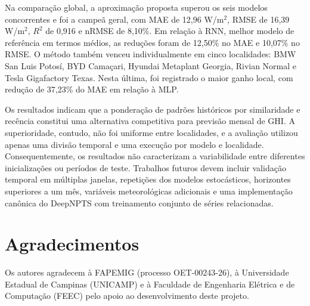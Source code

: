 \documentclass[11pt,a4paper]{article}
\begin{document}
Na comparação global, a aproximação proposta superou os seis modelos concorrentes e foi a campeã geral, com MAE de 12,96 W/m$^2$, RMSE de 16,39 W/m$^2$, $R^2$ de 0,916 e nRMSE de 8,10\%. Em relação à RNN, melhor modelo de referência em termos médios, as reduções foram de 12,50\% no MAE e 10,07\% no RMSE. O método também venceu individualmente em cinco localidades: BMW San Luis Potosí, BYD Camaçari, Hyundai Metaplant Georgia, Rivian Normal e Tesla Gigafactory Texas. Nesta última, foi registrado o maior ganho local, com redução de 37,23\% do MAE em relação à MLP.

Os resultados indicam que a ponderação de padrões históricos por similaridade e recência constitui uma alternativa competitiva para previsão mensal de GHI. A superioridade, contudo, não foi uniforme entre localidades, e a avaliação utilizou apenas uma divisão temporal e uma execução por modelo e localidade. Consequentemente, os resultados não caracterizam a variabilidade entre diferentes inicializações ou períodos de teste. Trabalhos futuros devem incluir validação temporal em múltiplas janelas, repetições dos modelos estocásticos, horizontes superiores a um mês, variáveis meteorológicas adicionais e uma implementação canônica do DeepNPTS com treinamento conjunto de séries relacionadas.

\section*{Agradecimentos}

Os autores agradecem à FAPEMIG (processo OET-00243-26), à Universidade Estadual de Campinas (UNICAMP) e à Faculdade de Engenharia Elétrica e de Computação (FEEC) pelo apoio ao desenvolvimento deste projeto.
\end{document}

